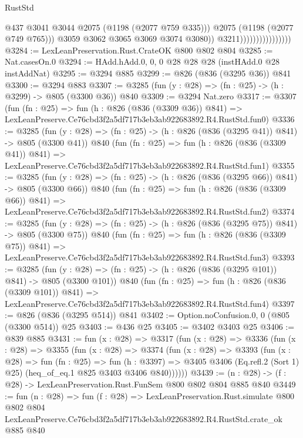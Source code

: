 \begin{lexlean}{RustStd}
\begin{coremodule}
                                            @437
                                            @3041
                                            @3044
                                            @2075
                                            (@1198 (@2077 @759 @335)))
                                          @2075
                                          (@1198 (@2077 @749 @765)))
                                        @3059
                                        @3062
                                        @3065
                                        @3069
                                        @3074
                                        @3080))
                                    @3211))))))))))))))))
@3284 := LexLeanPreservation.Rust.CrateOK @800 @802 @804
@3285 := Nat.casesOn.{0}
@3294 := HAdd.hAdd.{0, 0, 0} @28 @28 @28 (instHAdd.{0} @28 instAddNat)
@3295 := @3294 @885
@3299 := @826 (@836 (@3295 @36)) @841
@3300 := @3294 @883
@3307 := @3285 (fun (y : @28) => (fn : @25) -> (h : @3299) -> @805 (@3300 @36)) @840
@3309 := @3294 Nat.zero
@3317 := @3307
    (fun (fn : @25) =>
    fun (h : @826 (@836 (@3309 @36)) @841) =>
    LexLeanPreserve.Ce76cbd3f2a5df717b3eb3ab922683892.R4.RustStd.fun0)
@3336 := @3285
    (fun (y : @28) => (fn : @25) -> (h : @826 (@836 (@3295 @41)) @841) -> @805 (@3300 @41))
    @840
    (fun (fn : @25) =>
    fun (h : @826 (@836 (@3309 @41)) @841) =>
    LexLeanPreserve.Ce76cbd3f2a5df717b3eb3ab922683892.R4.RustStd.fun1)
@3355 := @3285
    (fun (y : @28) => (fn : @25) -> (h : @826 (@836 (@3295 @66)) @841) -> @805 (@3300 @66))
    @840
    (fun (fn : @25) =>
    fun (h : @826 (@836 (@3309 @66)) @841) =>
    LexLeanPreserve.Ce76cbd3f2a5df717b3eb3ab922683892.R4.RustStd.fun2)
@3374 := @3285
    (fun (y : @28) => (fn : @25) -> (h : @826 (@836 (@3295 @75)) @841) -> @805 (@3300 @75))
    @840
    (fun (fn : @25) =>
    fun (h : @826 (@836 (@3309 @75)) @841) =>
    LexLeanPreserve.Ce76cbd3f2a5df717b3eb3ab922683892.R4.RustStd.fun3)
@3393 := @3285
    (fun (y : @28) => (fn : @25) -> (h : @826 (@836 (@3295 @101)) @841) -> @805 (@3300 @101))
    @840
    (fun (fn : @25) =>
    fun (h : @826 (@836 (@3309 @101)) @841) =>
    LexLeanPreserve.Ce76cbd3f2a5df717b3eb3ab922683892.R4.RustStd.fun4)
@3397 := @826 (@836 (@3295 @514)) @841
@3402 := Option.noConfusion.{0, 0} (@805 (@3300 @514)) @25
@3403 := @436 @25
@3405 := @3402 @3403 @25
@3406 := @839 @885
@3431 := fun (x : @28) =>
  @3317
    (fun (x : @28) =>
    @3336
      (fun (x : @28) =>
      @3355
        (fun (x : @28) =>
        @3374
          (fun (x : @28) =>
          @3393
            (fun (x : @28) =>
            fun (fn : @25) =>
            fun (h : @3397) =>
            @3405 @3406 (Eq.refl.{2} (Sort 1) @25) (heq_of_eq.{1} @825 @3403 @3406 @840))))))
@3439 := (n : @28) -> (f : @28) -> LexLeanPreservation.Rust.FunSem @800 @802 @804 @885 @840
@3449 := fun (n : @28) =>
  fun (f : @28) =>
  LexLeanPreservation.Rust.simulate
    @800
    @802
    @804
    LexLeanPreserve.Ce76cbd3f2a5df717b3eb3ab922683892.R4.RustStd.crate_ok
    @885
    @840
\end{coremodule}
\end{lexlean}
